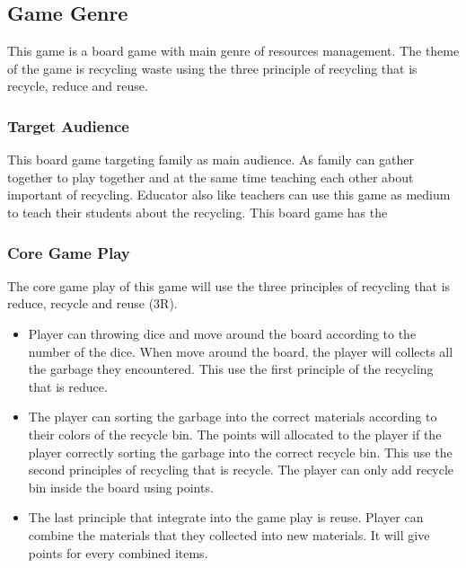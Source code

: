 \documentclass[12pt]{article}
\begin{document}
\subsection{Game Genre}
This game is a board game with main genre of resources management. The theme of the game is recycling waste using the three principle of recycling that is recycle, reduce and reuse.  

\subsubsection{Target Audience}
This board game targeting family as main audience. As family can gather together to play together and at the same time teaching each other about important of recycling. Educator also like teachers can use this game as medium to teach their students about the recycling. This board game has the 

\subsubsection{Core Game Play}
The core game play of this game will use the three principles of recycling that is reduce, recycle and reuse (3R). 
\begin{itemize}
    \item Player can throwing dice and move around the board according to the number of the dice. When move around the board, the player will collects all the garbage they encountered. This use the first principle of the recycling that is reduce.
    \item The player can sorting the garbage into the correct materials according to their colors of the recycle bin. The points will allocated to the player if the player correctly sorting the garbage into the correct recycle bin. This use the second principles of recycling that is recycle. The player can only add recycle bin inside the board using points. 
    \item The last principle that integrate into the game play is reuse. Player can combine the materials that they collected into new materials. It will give points for every combined items.
    
\end{itemize}
\end{document}
